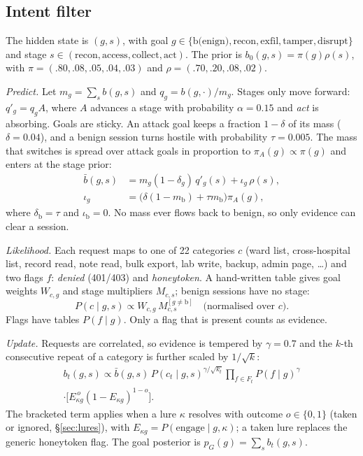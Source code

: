 \documentclass[conference,10pt]{IEEEtran}
\begin{document}
\subsection{Intent filter}
The hidden state is $(g,s)$, with goal $g\in\{\text{b(enign)},\text{recon},\text{exfil},\text{tamper},
\text{disrupt}\}$ and stage $s\in(\text{recon},\text{access},\text{collect},\text{act})$. The prior
is $b_0(g,s)=\pi(g)\rho(s)$, with $\pi=(.80,.08,.05,.04,.03)$ and $\rho=(.70,.20,.08,.02)$.

\emph{Predict.} Let $m_g=\sum_s b(g,s)$ and $q_g=b(g,\cdot)/m_g$. Stages only move forward:
$q'_g=q_gA$, where $A$ advances a stage with probability $\alpha=0.15$ and \emph{act} is absorbing.
Goals are sticky. An attack goal keeps a fraction $1-\delta$ of its mass ($\delta=0.04$), and a
benign session turns hostile with probability $\tau=0.005$. The mass that switches is spread over
attack goals in proportion to $\pi_A(g)\propto\pi(g)$ and enters at the stage prior:
\begin{align}
\bar b(g,s)&=m_g(1-\delta_g)\,q'_g(s)+\iota_g\,\rho(s),\label{eq:pred}\\
\iota_g&=\big(\delta(1-m_\text{b})+\tau m_\text{b}\big)\pi_A(g),\nonumber
\end{align}
where $\delta_\text{b}=\tau$ and $\iota_\text{b}=0$. No mass ever flows back to benign, so only
evidence can clear a session.

\emph{Likelihood.} Each request maps to one of 22 categories $c$ (ward list, cross-hospital list,
record read, note read, bulk export, lab write, backup, admin page, \dots) and two flags $f$:
\emph{denied} (401/403) and \emph{honeytoken}. A hand-written table gives goal weights $W_{c,g}$
and stage multipliers $M_{c,s}$; benign sessions have no stage:
\begin{equation}
P(c\mid g,s)\propto W_{c,g}\,M_{c,s}^{[g\neq\text{b}]}\quad\text{(normalised over $c$).}\label{eq:lik}
\end{equation}
Flags have tables $P(f\mid g)$. Only a flag that is present counts as evidence.

\emph{Update.} Requests are correlated, so evidence is tempered by $\gamma=0.7$ and the $k$-th
consecutive repeat of a category is further scaled by $1/\sqrt{k}$:
\begin{multline}
b_t(g,s)\propto\bar b(g,s)\,P(c_t\mid g,s)^{\gamma/\sqrt{k_t}}\prod_{f\in F_t}P(f\mid g)^{\gamma}\\
\cdot\big[E_{\kappa g}^{\,o}(1-E_{\kappa g})^{1-o}\big].\label{eq:upd}
\end{multline}
The bracketed term applies when a lure $\kappa$ resolves with outcome $o\in\{0,1\}$ (taken or
ignored, \S\ref{sec:lures}), with $E_{\kappa g}=P(\text{engage}\mid g,\kappa)$; a taken lure replaces
the generic honeytoken flag. The goal posterior is
$p_G(g)=\sum_s b_t(g,s)$.
\end{document}
